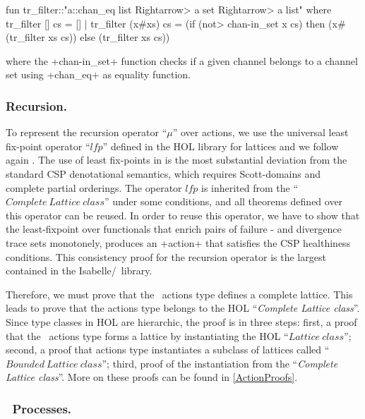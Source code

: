 \documentclass[11pt,a4paper]{article}
\begin{document}
\begin{isar}
fun tr_filter::"a::chan_eq list \<Rightarrow> a set \<Rightarrow> a list" where
  tr_filter [] cs = []
| tr_filter (x#xs) cs = (if (\<not> chan-in_set x cs) 
                              then (x#(tr_filter xs cs))
                                else (tr_filter xs cs))
\end{isar}

\noindent where the \inlineisar+chan-in_set+ function checks if a given channel belongs to a channel 
set using \inlineisar+chan_eq+ as equality function.


\subsubsection{Recursion.}
To represent the recursion operator ``$\mu$'' over actions, we use the universal least fix-point 
operator ``$lfp$'' defined in the HOL library for lattices and we follow again \cite{CircusDS}. 
The use of least fix-points in \cite{CircusDS} is the most substantial deviation from the standard 
CSP denotational semantics, which requires Scott-domains and complete partial orderings.
The operator $lfp$ is inherited from the ``$Complete~Lattice~class$'' under some conditions, 
and all theorems defined over this operator can be reused. 
In order to reuse this operator, we have to show that the least-fixpoint over functionals that 
enrich pairs of failure - and divergence trace sets monotonely, produces an \inlineisar+action+ 
that satisfies the CSP healthiness conditions. This consistency proof for the recursion operator 
is the largest contained in the Isabelle/\Circus\ library.

Therefore, we must prove that the \Circus\ actions type defines a complete lattice. 
This leads to prove that the actions type belongs to the HOL ``\emph{Complete Lattice class}''. 
Since type classes in HOL are hierarchic, the proof is in three steps: first, a proof that the 
\Circus\ actions type forms a lattice by instantiating the HOL ``$Lattice~class$''; second, a
proof that actions type instantiates a subclass of lattices called ``$Bounded~Lattice~class$''; 
third, proof of the instantiation from the ``\emph{Complete Lattice class}''. 
More on these proofs can be found in \ref{ActionProofs}.

\subsubsection{\texorpdfstring{\Circus\ Processes.}{Circus Processes.}}
\end{document}
